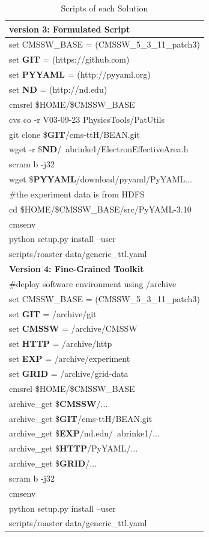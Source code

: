 \documentclass{acm_proc_article-sp}
\begin{document}
\begin{table}
\begin{tabular}{|l|}
        {\bf version 3: Formulated Script} \\ \hline
        set CMSSW\_BASE = (CMSSW\_5\_3\_11\_patch3) \\
        set {\bf GIT} = (https://github.com) \\
        set {\bf PYYAML} = (http://pyyaml.org) \\
        set {\bf ND} = (http://nd.edu) \\
        cmsrel \$HOME/\$CMSSW\_BASE \\
        cvs co -r V03-09-23 PhysicsTools/PatUtils \\
        git clone \${\bf GIT}/cms-ttH/BEAN.git \\
        wget -r \${\bf ND}/~abrinke1/ElectronEffectiveArea.h \\
        scram b -j32 \\
        wget \${\bf PYYAML}/download/pyyaml/PyYAML...\\
        \#the experiment data is from HDFS \\
        cd \$HOME/\$CMSSW\_BASE/src/PyYAML-3.10\\
        cmsenv\\
        python setup.py install --user \\
        scripts/roaster data/generic\_ttl.yaml \\ 
        \hline
        {\bf Version 4: Fine-Grained Toolkit}\\ \hline
        \#deploy software environment using /archive \\
        set CMSSW\_BASE = (CMSSW\_5\_3\_11\_patch3) \\
        set {\bf GIT} = /archive/git \\
        set {\bf CMSSW} = /archive/CMSSW \\
        set {\bf HTTP} = /archive/http \\
        set {\bf EXP} = /archive/experiment\\
        set {\bf GRID} = /archive/grid-data \\
        cmsrel \$HOME/\$CMSSW\_BASE \\
        archive\_get \${\bf CMSSW}/...\\
        archive\_get \${\bf GIT}/cms-ttH/BEAN.git \\
        archive\_get \${\bf EXP}/nd.edu/~abrinke1/... \\        
        archive\_get \${\bf HTTP}/PyYAML/...\\
        archive\_get \${\bf GRID}/...\\
        scram b -j32 \\
        cmsenv\\
        python setup.py install --user \\
        scripts/roaster data/generic\_ttl.yaml \\
        \hline
    \end{tabular}
    \caption{Scripts of each Solution}
    \label{table:scripts}
\end{table}
\end{document}
